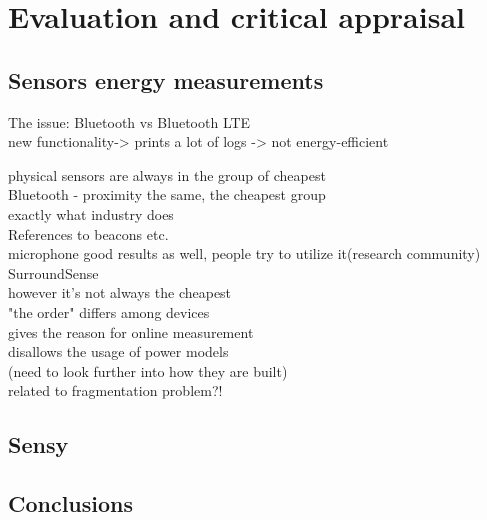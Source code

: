 \section{Evaluation and critical appraisal}
\label{s:evaluation}
\subsection{Sensors energy measurements}


The issue: Bluetooth vs Bluetooth LTE\\
	new functionality-> prints a lot of logs -> not energy-efficient\\








physical sensors are always in the group of cheapest \\

Bluetooth - proximity the same, the cheapest group\\
				exactly what industry does\\
				References to beacons etc.\\

microphone good results as well, people try to utilize it(research community)\\
				SurroundSense \cite{azizyan:surroundsense}\\
				however it's not always the cheapest\\
				
				
"the order" differs among devices\\
	gives the reason for online measurement\\
	disallows the usage of power models\\
		(need to look further into how they are built)\\
		related to fragmentation problem?!\\
								
\subsection{Sensy}
\subsection{Conclusions}